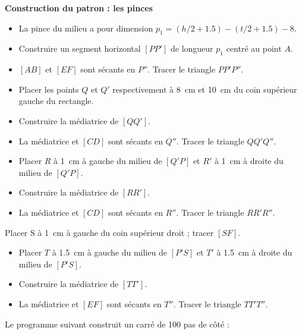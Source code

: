 \documentclass["../Cours.tex"]{subfiles}
\begin{document}
{\begin{questions}
\question \textbf{Construction du patron : les pinces}
    \subquestion 
    \begin{itemize}
        \item La pince du milieu a pour dimension $p_1 = (h/2+\num{1.5})-(t/2+\num{1.5})-8$.
        \item Construire un segment horizontal $[PP']$ de longueur $p_1$ centré au point $A$.
        \item $[AB]$ et $[EF]$ sont sécants en $P''$. Tracer le triangle $PP'P''$.
    \end{itemize}
    \subquestion 
    \begin{itemize}
        \item Placer les points $Q$ et $Q'$ respectivement à \qty{8}{\cm} et \qty{10}{\cm} du coin supérieur gauche du rectangle. 
        \item Construire la médiatrice de $[QQ']$.
        \item La médiatrice et $[CD]$ sont sécants en $Q''$. Tracer le triangle $QQ'Q''$.
    \end{itemize}
    \subquestion 
    \begin{itemize}
        \item Placer $R$ à \qty{1}{\cm} à gauche du milieu de $[Q'P]$ et $R'$ à \qty{1}{\cm} à droite du milieu de $[Q'P]$.
        \item Construire la médiatrice de $[RR']$.
        \item La médiatrice et $[CD]$ sont sécants en $R''$. Tracer le triangle $RR'R''$.
    \end{itemize}
    \subquestion Placer S à \qty{1}{\cm} à gauche du coin supérieur droit ; tracer $[SF]$.
    \subquestion 
    \begin{itemize}
        \item Placer $T$ à \qty{1.5}{\cm} à gauche du milieu de $[P'S]$ et $T'$ à \qty{1.5}{\cm} à droite du milieu de $[P'S]$.
        \item Construire la médiatrice de $[TT']$.
        \item La médiatrice et $[EF]$ sont sécants en $T''$. Tracer le triangle $TT'T''$.
    \end{itemize}
\end{questions}

\clearpage
{}

Le programme suivant construit un carré de 100 pas de côté :

\begin{center}
    \begin{scratch}[scale=0.8]
         {
        }
    \end{scratch}
\end{center}

}
\end{document}
